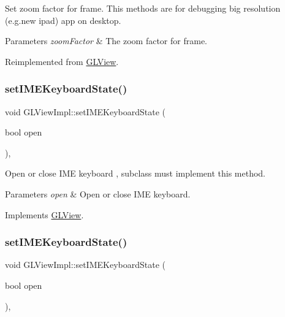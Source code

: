 Set zoom factor for frame. This methods are for debugging big resolution (e.\+g.\+new ipad) app on desktop.


\begin{DoxyParams}{Parameters}
{\em zoom\+Factor} & The zoom factor for frame. \\
\hline
\end{DoxyParams}


Reimplemented from \hyperlink{classGLView_afe38f42b6954c9bc29382f411b49f448}{G\+L\+View}.

\mbox{\label{classGLViewImpl_a134389b64b11ebd0af740c9acba58dc9}} 
\subsubsection{\texorpdfstring{set\+I\+M\+E\+Keyboard\+State()}{setIMEKeyboardState()}\hspace{0.1cm}{\footnotesize\ttfamily [1/9]}}
{\footnotesize\ttfamily void G\+L\+View\+Impl\+::set\+I\+M\+E\+Keyboard\+State (\begin{DoxyParamCaption}\item[{bool}]{open }\end{DoxyParamCaption})\hspace{0.3cm}{\ttfamily [override]}, {\ttfamily [virtual]}}

Open or close I\+ME keyboard , subclass must implement this method.


\begin{DoxyParams}{Parameters}
{\em open} & Open or close I\+ME keyboard. \\
\hline
\end{DoxyParams}


Implements \hyperlink{classGLView_aaa70edad9dd4b2052237867db978e06d}{G\+L\+View}.

\mbox{\label{classGLViewImpl_a134389b64b11ebd0af740c9acba58dc9}} 
\subsubsection{\texorpdfstring{set\+I\+M\+E\+Keyboard\+State()}{setIMEKeyboardState()}\hspace{0.1cm}{\footnotesize\ttfamily [2/9]}}
{\footnotesize\ttfamily void G\+L\+View\+Impl\+::set\+I\+M\+E\+Keyboard\+State (\begin{DoxyParamCaption}\item[{bool}]{open }\end{DoxyParamCaption})\hspace{0.3cm}{\ttfamily [override]}, {\ttfamily [virtual]}}

